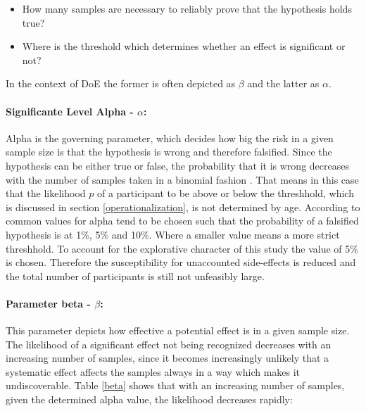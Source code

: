             \begin{itemize}
                \item How many samples are necessary to reliably prove that the hypothesis holds true?
                \item Where is the threshold which determines whether an effect is significant or not?
            \end{itemize}

            In the context of DoE the former is often depicted as $\beta$ and the latter as $\alpha$.

            \paragraph{Significante Level Alpha - $\alpha$:} Alpha is the governing parameter, which decides how big the risk in a given sample size is that the hypothesis is wrong and therefore falsified. Since the hypothesis can be either true or false, the probability that it is wrong decreases with the number of samples taken in a binomial fashion \cite[103]{Siebertz.2017}. That means in this case that the likelihood $p$ of a participant to be above or below the threshhold, which is discussed in section \ref*{operationalization}, is not determined by age. According to \cite[110]{Siebertz.2017} common values for alpha tend to be chosen such that the probability of a falsified hypothesis is at 1\%, 5\% and 10\%. Where a smaller value means a more strict threshhold. To account for the explorative character of this study the value of 5\% is chosen. Therefore the susceptibility for unaccounted side-effects is reduced and the total number of participants is still not unfeasibly large.

            \paragraph{Parameter beta - $\beta$:} This parameter depicts how effective a potential effect is in a given sample size. The likelihood of a significant effect not being recognized decreases with an increasing number of samples, since it becomes increasingly unlikely that a systematic effect affects the samples always in a way which makes it undiscoverable.
            Table \ref*{beta} shows that with an increasing number of samples, given the determined alpha value, the likelihood decreases rapidly:

